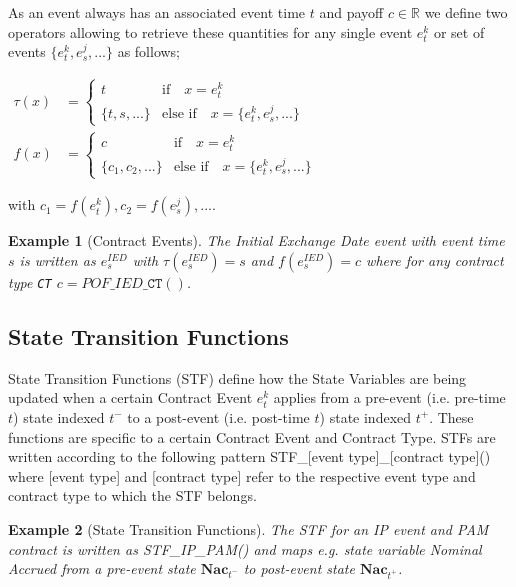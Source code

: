 \documentclass[9pt,oneside]{amsart}
\newtheorem{example}{Example}
\newcommand{\Real}{\mathbb{R}}
\newcommand{\svar}[2]{\textbf{#1}_{#2}}
\newcommand{\attr}[1]{\texttt{#1}}
\newcommand{\stf}[2]{STF\_#1\_#2()}
\newcommand{\pof}[2]{POF\_#1\_#2()}
\newcommand{\tev}[1]{\tau(#1)}
\newcommand{\fev}[1]{f(#1)}
\begin{document}
\begin{multicols}{2}
As an event always has an associated event time $t$ and payoff $c\in\Real$ we define two operators allowing to retrieve these quantities for any single event $e_t^k$ or set of events $\{e_t^k,e_s^j, ...\}$ as follows;

{$\begin{aligned} 
	\tev{x} &= \begin{cases} t & \text{if}\quad x=e_t^k \\
				\{t,s,...\} & \text{else if}\quad x=\{e_t^k,e_s^j,...\} \end{cases} \\
	\fev{x} &= \begin{cases} c & \text{if}\quad x=e_t^k \\
				\{c_1, c_2, ...\} & \text{else if}\quad x=\{e_t^k,e_s^j,...\} \end{cases}
\end{aligned}$}

with $c_1=\fev{e_t^k}, c_2=\fev{e_s^j}, ...$.

\begin{example}[Contract Events]
The \textit{Initial Exchange Date} event with event time $s$ is written as $e_s^{IED}$ with $\tev{e_s^{IED}}=s$ and $\fev{e_s^{IED}}=c$ where for any contract type \attr{CT} $c=\pof{IED}{\attr{CT}}$.
\end{example}


\subsection{State Transition Functions}\label{sec:stf}

State Transition Functions (STF) define how the State Variables are being updated when a certain Contract Event $e_t^{k}$ applies from a pre-event (i.e. pre-time $t$) state indexed $t^-$ to a post-event (i.e. post-time $t$) state indexed $t^+$. These functions are specific to a certain Contract Event and Contract Type. STFs are written according to the following pattern \stf{[event type]}{[contract type]} where [event type] and [contract type] refer to the respective event type and contract type to which the STF belongs.

\begin{example}[State Transition Functions]
The STF for an IP event and PAM contract is written as \stf{IP}{PAM} and maps e.g. state variable \textit{Nominal Accrued} from a pre-event state $\svar{Nac}{t^-}$ to post-event state $\svar{Nac}{t^+}$.
\end{example}



\end{multicols}
\end{document}
